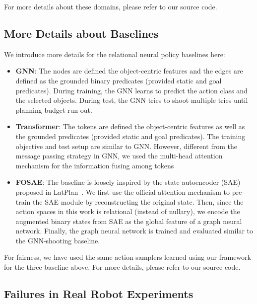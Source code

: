 For more details about these domains, please refer to our source code.


\subsection{More Details about Baselines}\label{app:baseline_details}
We introduce more details for the relational neural policy baselines here:
\begin{itemize}
    \item \textbf{GNN}: The nodes are defined the object-centric features and the edges are defined as the grounded binary predicates (provided static and goal predicates).
    During training, the GNN learns to predict the action class and the selected objects.
    During test, the GNN tries to shoot multiple tries until planning budget run out.
    \item \textbf{Transformer}: The tokens are defined the object-centric features as well as the grounded predicates (provided static and goal predicates).
    The training objective and test setup are similar to GNN.
    However, different from the message passing strategy in GNN, we used the multi-head attention mechanism for the information fusing among tokens
    \item \textbf{FOSAE}: The baseline is loosely inspired by the state autoencoder (SAE) proposed in LatPlan~\cite{asai2019latplan_fol}. We first use the official attention mechanism to pre-train the SAE module by reconstructing the original state.
    Then, since the action spaces in this work is relational (instead of nullary), we encode the augmented binary states from SAE as the global feature of a graph neural network.
    Finally, the graph neural network is trained and evaluated similar to the GNN-shooting baseline.
\end{itemize}
For fairness, we have used the same action samplers learned using our framework for the three baseline above. 
For more details, please refer to our source code.

\subsection{Failures in Real Robot Experiments}\label{app:failures}


